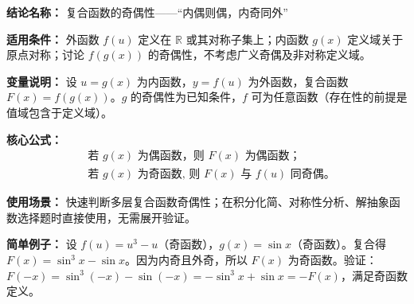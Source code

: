 \textbf{结论名称：} 复合函数的奇偶性——“内偶则偶，内奇同外”

\textbf{适用条件：} 外函数 \(f(u)\) 定义在 \(\mathbb{R}\) 或其对称子集上；内函数 \(g(x)\) 定义域关于原点对称；讨论 \(f(g(x))\) 的奇偶性，不考虑广义奇偶及非对称定义域。

\textbf{变量说明：} 设 \(u = g(x)\) 为内函数，\(y = f(u)\) 为外函数，复合函数 \(F(x) = f(g(x))\)。\(g\) 的奇偶性为已知条件，\(f\) 可为任意函数（存在性的前提是值域包含于定义域）。

\textbf{核心公式：}
\[
\boxed{
\begin{aligned}
&\text{若 } g(x) \text{ 为偶函数，则 } F(x) \text{ 为偶函数；}\\
&\text{若 } g(x) \text{ 为奇函数, 则 } F(x) \text{ 与 } f(u) \text{ 同奇偶。}
\end{aligned}
}
\]

\textbf{使用场景：} 快速判断多层复合函数奇偶性；在积分化简、对称性分析、解抽象函数选择题时直接使用，无需展开验证。

\textbf{简单例子：} 设 \(f(u) = u^3 - u\)（奇函数），\(g(x) = \sin x\)（奇函数）。复合得 \(F(x) = \sin^3 x - \sin x\)。因为内奇且外奇，所以 \(F(x)\) 为奇函数。验证：\(F(-x) = \sin^3(-x) - \sin(-x) = -\sin^3 x + \sin x = -F(x)\)，满足奇函数定义。